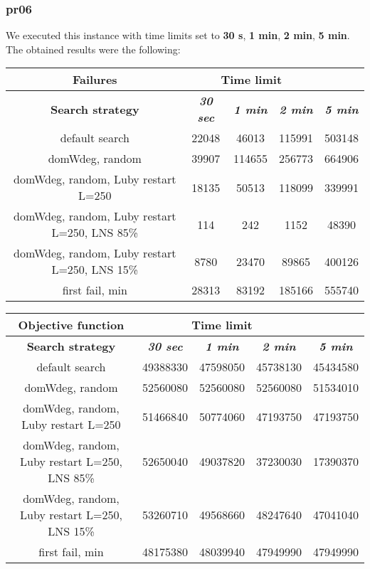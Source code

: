 \subsubsection{pr06}
We executed this instance with time limits set to \textbf{30 s}, \textbf{1 min}, \textbf{2 min}, \textbf{5 min}.\\
The obtained results were the following:
{
\renewcommand{\arraystretch}{2}
\begin{longtable}[h]{| c | c | c | c | c |}
    \hline
    \textbf{Failures} & \multicolumn{3}{c}{Time limit} & \\
    \hline
    \textbf{Search strategy} & \textbf{\textit{30 sec}} & \textbf{\textit{1 min}} & \textbf{\textit{2 min}} & \textbf{\textit{5 min}} \\
    \hline
    \endhead
    default search                                & 22048 &  46013 & 115991 & 503148 \\
    \hline
    domWdeg, random                               & 39907 & 114655 & 256773 & 664906 \\
    \hline
    domWdeg, random, Luby restart L=250           & 18135 &  50513 & 118099 & 339991 \\
    \hline
    domWdeg, random, Luby restart L=250, LNS 85\% &   114 &    242 &   1152 &  48390 \\
    \hline
    domWdeg, random, Luby restart L=250, LNS 15\% &  8780 &  23470 &  89865 & 400126 \\
    \hline
    first fail, min                               & 28313 &  83192 & 185166 & 555740 \\
    \hline
\end{longtable}
}

{
\renewcommand{\arraystretch}{2}
\begin{longtable}[h]{| c | c | c | c | c |}
    \hline
    \textbf{Objective function} & \multicolumn{3}{c}{Time limit} & \\
    \hline
    \textbf{Search strategy} & \textbf{\textit{30 sec}} & \textbf{\textit{1 min}} & \textbf{\textit{2 min}} & \textbf{\textit{5 min}} \\
    \hline
    \endhead
    default search                                & 49388330 & 47598050 & 45738130 & 45434580 \\
    \hline
    domWdeg, random                               & 52560080 & 52560080 & 52560080 & 51534010 \\
    \hline
    domWdeg, random, Luby restart L=250           & 51466840 & 50774060 & 47193750 & 47193750 \\
    \hline
    domWdeg, random, Luby restart L=250, LNS 85\% & 52650040 & 49037820 & 37230030 & 17390370 \\
    \hline
    domWdeg, random, Luby restart L=250, LNS 15\% & 53260710 & 49568660 & 48247640 & 47041040 \\
    \hline
    first fail, min                               & 48175380 & 48039940 & 47949990 & 47949990 \\
    \hline
\end{longtable}
}